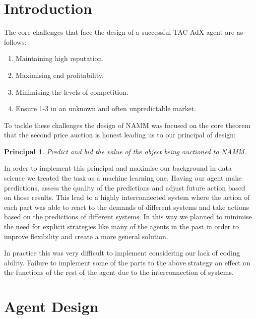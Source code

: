 \documentclass{sig-alternate-05-2015}
\begin{document}


\section{Introduction}
The core challenges that face the design of a successful TAC AdX agent are as follows:

\begin{enumerate}
\item Maintaining high reputation. 
\item Maximising end profitability. 
\item Minimising the levels of competition.
\item Ensure 1-3 in an unknown and often unpredictable market. 
\end{enumerate}

To tackle these challenges the design of NAMM was focused on the core theorem that the second price auction is honest\cite{vickrey1961counterspeculation} leading us to our principal of design: 

\newtheorem{theorem}{Principal}
\begin{theorem}
Predict and bid the value of the object being auctioned to NAMM. 
\end{theorem}

In order to implement this principal and maximise our background in data science we treated the task as a machine learning one. Having our agent make predictions, assess the quality of the predictions and adjust future action based on those results. This lead to a highly interconnected system where the action of each part was able to react to the demands of different systems and take actions based on the predictions of different systems. In this way we planned to minimise the need for explicit strategies like many of the agents in the past \cite{tao2015tac} in order to improve flexibility and create a more general solution.  

In practice this was very difficult to implement considering our lack of coding ability. Failure to implement some of the parts to the above strategy an effect on the functions of the rest of the agent due to the interconnection of systems.
 
\section{Agent Design}
\end{document}
